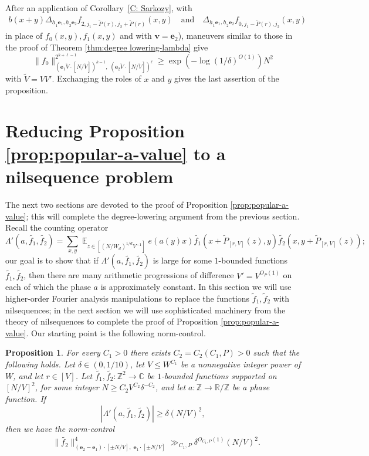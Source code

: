 \documentclass[11pt]{amsart}
\newtheorem{proposition}[lemma]{Proposition}
\theoremstyle{definition}
\DeclareMathOperator*{\E}{\mathbb{E}}
\newcommand{\Z}{{\mathbb Z}}
\newcommand{\be}{{\mathbf{e}}}
\newcommand{\bv}{{\textbf{v}}}
\newcommand{\uh}{{\underline{h}}}
\begin{document}
After an application of Corollary~\ref{C: Sarkozy}, with
\begin{align*}
 b(x+y)\Delta_{\uh_1 \be_1,\uh_2 \be_2}f_{2, j_1 - \widetilde P(r), j_2 + \widetilde P(r)}(x,y)\quad \textrm{and}\quad \Delta_{\uh_1 \be_1,\uh_2 \be_2}f_{0, j_1 - \widetilde P(r), j_2}(x,y) 
\end{align*}
in place of $f_0(x,y), f_1(x,y)$ and with $\bv = \be_2$), maneuvers similar to those in the proof of Theorem \ref{thm:degree lowering-lambda} give  
    $$\|f_{0}\|_{(\be_1\tilde{V} \cdot [N/\tilde{V}])^{k-1},\; (\be_2\tilde{V} \cdot [N/\tilde{V}])^{\ell}}^{2^{k+\ell-1}} \geq \exp(-\log(1/\delta)^{O(1)}) N^2$$
    with $\tilde{V} = VV'.$
Exchanging the roles of $x$ and $y$ gives the last assertion of the proposition.

\section{Reducing Proposition \ref{prop:popular-a-value} to a nilsequence problem}\label{S: lambda'}
The next two sections are devoted to the proof of Proposition \ref{prop:popular-a-value}; this will complete the degree-lowering argument from the previous section. Recall the counting operator
$$\Lambda'(a,\widetilde{f_1},\widetilde{f_2})=\sum_{x,y} \E_{z \in [(N/W_d)^{1/d}V^{-1}]} e(a(y)x) \widetilde{f_1}(x+\widetilde P_{[r, V]}(z),y) \widetilde{f_2}(x,y+\widetilde P_{[r, V]}(z));$$
our goal is to show that if $\Lambda'(a, \widetilde{f_1}, \widetilde{f_2})$ is large for some $1$-bounded functions $\widetilde{f_1}, \widetilde{f_2}$, then there are many arithmetic progressions of difference $V' = V^{O_P(1)}$ on each of which the phase $a$ is approximately constant. In this section we will use higher-order Fourier analysis manipulations to replace the functions $\widetilde f_1,\widetilde f_2$ with nilsequences; in the next section we will use sophisticated machinery from the theory of nilsequences to complete the proof of Proposition \ref{prop:popular-a-value}. Our starting point is the following norm-control.

\begin{proposition}\label{prop:lambda_1}
For every $C_1>0$ there exists $C_2=C_2(C_1,P)>0$ such that the following holds. Let $\delta\in(0,1/10)$, let $V \leq W^{C_1}$ be a nonnegative integer power of $W$, and let $r\in[V]$. Let $\widetilde{f_1},\widetilde{f_2}: \Z^2 \to \mathbb{C}$ be $1$-bounded functions supported on $[N/V]^2$, for some integer $N\ge C_2V^{C_2}\delta^{-C_2}$, and let $a: \mathbb{Z} \to \mathbb{R}/\mathbb{Z}$ be a phase function.  If
$$|\Lambda'(a,\widetilde{f_1}, \widetilde{f_2})| \geq \delta (N/V)^{2},$$
then we have the norm-control
\begin{align*}
&\|\widetilde{f_2}\|_{(\be_2-\be_1)\cdot  [\pm N/V],\; \be_1\cdot [\pm N/V]}^4 \gg_{C_1, P} \delta^{O_{C_1,P}(1)}(N/V)^2.    
\end{align*}
\end{proposition}
\end{document}
